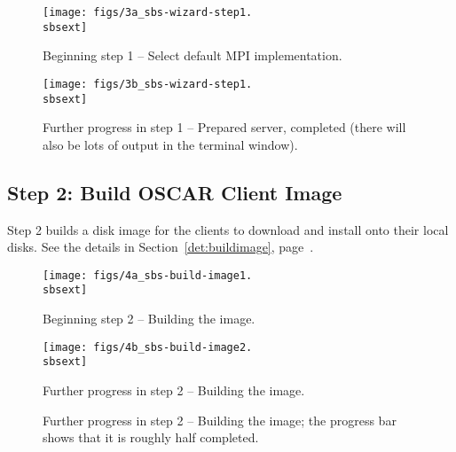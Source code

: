 \begin{figure}[htbp]
  \begin{center}
    \centerline{\texttt{[image: figs/3a\_sbs-wizard-step1.\\sbsext]}}
    \caption{Beginning step 1 -- Select default MPI implementation.}
    \label{fig:sbs-install-wizard-s1}
  \end{center}
\end{figure}

\begin{figure}[htbp]
  \begin{center}
    \centerline{\texttt{[image: figs/3b\_sbs-wizard-step1.\\sbsext]}}
    \caption[Further progress in step 1 -- Prepared server,
    completed.]{Further progress in step 1 -- Prepared server,
      completed (there will also be lots of output in the terminal
      window).}
    \label{fig:sbs-install-wizard-s1b}
  \end{center}
\end{figure}

\clearpage



\subsection{Step 2: Build OSCAR Client Image}

Step 2 builds a disk image for the clients to download and install
onto their local disks.  See the details in
Section~\ref{det:buildimage}, page~\pageref{det:buildimage}.

\begin{figure}[htbp]
  \begin{center}
    \centerline{\texttt{[image: figs/4a\_sbs-build-image1.\\sbsext]}}
    \caption{Beginning step 2 -- Building the image.}
    \label{fig:sbs-build-image}
  \end{center}
\end{figure}

\begin{figure}[htbp]
  \begin{center}
    \centerline{\texttt{[image: figs/4b\_sbs-build-image2.\\sbsext]}}
    \caption[Further progress in step 2 -- Building the
    image.]{Further progress in step 2 -- Building the image; the
      progress bar shows that it is roughly half completed.}
    \label{fig:sbs-build-image-progress}{Further progress in step 2 --
      Building the image.}
  \end{center}
\end{figure}

